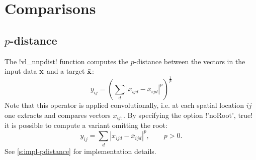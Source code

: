 \section{Comparisons}\label{s:comparisons}

\subsection{$p$-distance}\label{s:pdistance}

The !vl_nnpdist! function computes the $p$-distance between the vectors in the input data $\mathbf{x}$ and a target $\bar{\mathbf{x}}$:
\[
  y_{ij} = \left(\sum_d |x_{ijd} - \bar x_{ijd}|^p\right)^\frac{1}{p}
\]
Note that this operator is applied convolutionally, i.e. at each spatial location $ij$ one extracts and compares vectors $x_{ij:}$. By specifying the option !'noRoot', true! it is possible to compute a variant omitting the root:
\[
  y_{ij} = \sum_d |x_{ijd} - \bar x_{ijd}|^p, \qquad p > 0.
\]
See \cref{s:impl-pdistance} for implementation details.

%
%
%
%
%
%

